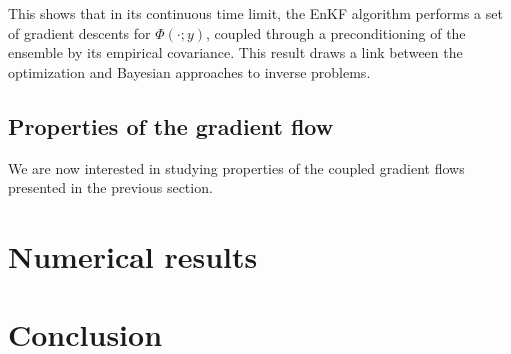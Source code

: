 \documentclass[a4paper,5p]{elsarticle}
\begin{document}
This shows that in its continuous time limit, the EnKF algorithm performs a set of gradient descents
for $\Phi(\cdot; y)$, coupled through a preconditioning of the ensemble by its empirical covariance. This
result draws a link between the optimization and Bayesian approaches to inverse problems.

\subsection{Properties of the gradient flow} \label{subsec:3:2}

We are now interested in studying properties of the coupled gradient flows presented
in the previous section.

\section{Numerical results} \label{sec:4}

\section{Conclusion} \label{sec:5}



\end{document}
